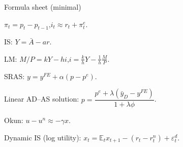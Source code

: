 \documentclass[aspectratio=169,xcolor=dvipsnames]{beamer}
\let\tempone\itemize
\let\temptwo\enditemize
\renewenvironment{itemize}{\tempone\addtolength{\itemsep}{\fill}}{\temptwo}
\begin{document}
\begin{frame}{Formula sheet (minimal)}
\small
\begin{itemize}
\item $\pi_t=p_t-p_{t-1}$,\quad $i_t\approx r_t+\pi_t^e$.
\item IS: $Y=\bar A-a r$.
\item LM: $M/P=kY-h i$,\quad $i=\frac{k}{h}Y-\frac{1}{h}\frac{M}{P}$.
\item SRAS: $y=y^{FE}+\alpha(p-p^e)$.
\item Linear AD--AS solution: $p=\dfrac{p^e+\lambda(\bar y_D-y^{FE})}{1+\lambda\phi}$.
\item Okun: $u-u^n\approx -\gamma x$.
\item Dynamic IS (log utility): $x_t=\mathbb{E}_t x_{t+1}-(r_t-r_t^n)+\varepsilon_t^d$.
\end{itemize}
\end{frame}
\end{document}
